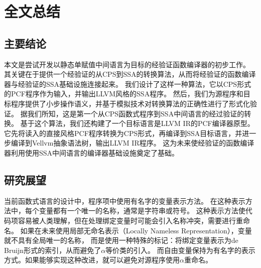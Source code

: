 
\chapter{全文总结} \label{ch:summary}

\section{主要结论}

本文是尝试开发以静态单赋值中间语言为目标的经验证函数编译器的初步工作。
其关键在于提供一个经验证的从CPS到SSA的转换算法，从而将经验证的函数编译器与经验证的SSA基础设施连接起来。
我们设计了这样一种算法，它以CPS形式的PCF程序作为输入，并输出LLVM风格的SSA程序。
然后，我们为源程序和目标程序提供了小步操作语义，并基于模拟技术对转换算法的正确性进行了形式化验证。
据我们所知，这是第一个从CPS函数式程序到SSA中间语言的经过验证的转换。
基于这个算法，我们还构建了一个目标语言是LLVM IR的PCF编译器原型。
它先将读入的直接风格PCF程序转换为CPS形式，再编译到SSA目标语言，并进一步编译到Vellvm抽象语法树，输出LLVM IR程序。
这为未来使经验证的函数编译器利用使用SSA中间语言的编译器基础设施奠定了基础。

\section{研究展望}

当前函数式语言的设计中，程序项中使用有名字的变量表示方法。
在这种表示方法中，每个变量都有一个唯一的名称，通常是字符串或符号。
这种表示方法使代码项容易被人类理解，但在处理绑定变量时可能会引入名称冲突，需要进行重命名。
如果在未来使用局部无命名表示（Locally Nameless Representation），变量就不具有全局唯一的名称，
而是使用一种特殊的标记：将绑定变量表示为de Bruijn形式的索引，从而避免了$\alpha$等价类的引入。
而自由变量保持为有名字的表示方式。如果能够实现这种改进，就可以避免对源程序使用$\alpha$重命名。

